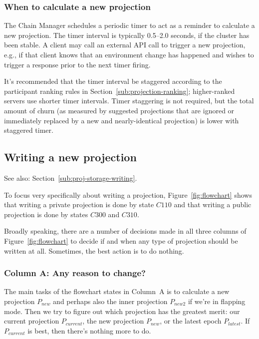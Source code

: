 \documentclass[preprint,10pt]{sigplanconf}
\begin{document}
\subsubsection{When to calculate a new projection}

The Chain Manager schedules a periodic timer to act as a reminder to
calculate a new projection.  The timer interval is typically
0.5--2.0 seconds, if the cluster has been stable.  A client may call an
external API call to trigger a new projection, e.g., if that client
knows that an environment change has happened and wishes to trigger a
response prior to the next timer firing.

It's recommended that the timer interval be staggered according to the
participant ranking rules in Section~\ref{sub:projection-ranking};
higher-ranked servers use shorter timer intervals.  Timer staggering
is not required, but the total amount of churn (as measured by
suggested projections that are ignored or immediately replaced by a
new and nearly-identical projection) is lower with staggered timer.

\subsection{Writing a new projection}
\label{sub:humming-proj-storage-writing}

See also: Section~\ref{sub:proj-storage-writing}.

To focus very specifically about writing a projection,
Figure~\ref{fig:flowchart} shows that writing a private projection is
done by state $C110$ and that writing a public projection is done by
states $C300$ and $C310$.

Broadly speaking, there are a number of decisions made in all three
columns of Figure~\ref{fig:flowchart} to decide if and when any type
of projection should be written at all.  Sometimes, the best action is
to do nothing.

\subsubsection{Column A: Any reason to change?}

The main tasks of the flowchart states in Column~A is to calculate a
new projection $P_{new}$ and perhaps also the inner projection
$P_{new2}$ if we're in flapping mode.  Then we try to figure out which
projection has the greatest merit: our current projection
$P_{current}$, the new projection $P_{new}$, or the latest epoch
$P_{latest}$.  If $P_{current}$ is best, then there's nothing more to
do.
\end{document}
